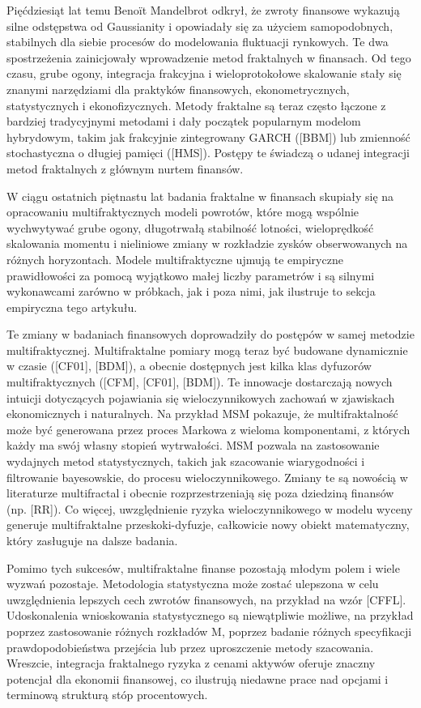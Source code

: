 \documentclass[12pt]{article}
\theoremstyle{definition}
\begin{document}
Pięćdziesiąt lat temu Benoït Mandelbrot odkrył, że zwroty finansowe wykazują silne odstępstwa od Gaussianity i opowiadały się za użyciem samopodobnych, stabilnych dla siebie procesów do modelowania fluktuacji rynkowych. Te dwa spostrzeżenia zainicjowały wprowadzenie metod fraktalnych w finansach. Od tego czasu, grube ogony, integracja frakcyjna i wieloprotokołowe skalowanie stały się znanymi narzędziami dla praktyków finansowych, ekonometrycznych, statystycznych i ekonofizycznych. Metody fraktalne są teraz często łączone z bardziej tradycyjnymi metodami i dały początek popularnym modelom hybrydowym, takim jak frakcyjnie zintegrowany GARCH ([BBM]) lub zmienność stochastyczna o długiej pamięci ([HMS]). Postępy te świadczą o udanej integracji metod fraktalnych z głównym nurtem finansów.

W ciągu ostatnich piętnastu lat badania fraktalne w finansach skupiały się na opracowaniu multifraktycznych modeli powrotów, które mogą wspólnie wychwytywać grube ogony, długotrwałą stabilność lotności, wieloprędkość skalowania momentu i nieliniowe zmiany w rozkładzie zysków obserwowanych na różnych horyzontach. Modele multifraktyczne ujmują te empiryczne prawidłowości za pomocą wyjątkowo małej liczby parametrów i są silnymi wykonawcami zarówno w próbkach, jak i poza nimi, jak ilustruje to sekcja empiryczna tego artykułu.

Te zmiany w badaniach finansowych doprowadziły do ​​postępów w samej metodzie multifraktycznej. 
Multifraktalne pomiary mogą teraz być budowane dynamicznie w czasie ([CF01], [BDM]), a obecnie dostępnych jest kilka klas dyfuzorów multifraktycznych ([CFM], [CF01], [BDM]). 
Te innowacje dostarczają nowych intuicji dotyczących pojawiania się wieloczynnikowych zachowań w zjawiskach ekonomicznych i naturalnych. Na przykład MSM pokazuje, że multifraktalność może być generowana przez proces Markowa z wieloma komponentami, z których każdy ma swój własny stopień wytrwałości. MSM pozwala na zastosowanie wydajnych metod statystycznych, takich jak szacowanie wiarygodności i filtrowanie bayesowskie, do procesu wieloczynnikowego. Zmiany te są nowością w literaturze multifractal i obecnie rozprzestrzeniają się poza dziedziną finansów (np. [RR]). Co więcej, uwzględnienie ryzyka wieloczynnikowego w modelu wyceny generuje multifraktalne przeskoki-dyfuzje, całkowicie nowy obiekt matematyczny, który zasługuje na dalsze badania.

Pomimo tych sukcesów, multifraktalne finanse pozostają młodym polem i wiele wyzwań pozostaje. Metodologia statystyczna może zostać ulepszona w celu uwzględnienia lepszych cech zwrotów finansowych, na przykład na wzór [CFFL]. Udoskonalenia wnioskowania statystycznego są niewątpliwie możliwe, na przykład poprzez zastosowanie różnych rozkładów M, poprzez badanie różnych specyfikacji prawdopodobieństwa przejścia lub przez uproszczenie metody szacowania. Wreszcie, integracja fraktalnego ryzyka z cenami aktywów oferuje znaczny potencjał dla ekonomii finansowej, co ilustrują niedawne prace nad opcjami i terminową strukturą stóp procentowych.
\end{document}
